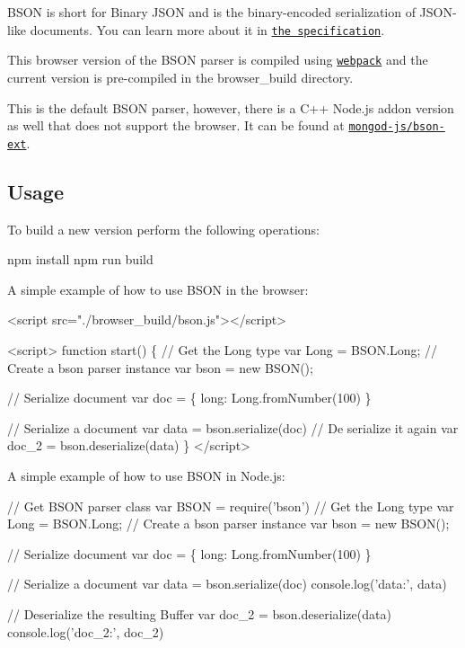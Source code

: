 B\+S\+ON is short for Bin­ary J\+S\+ON and is the bin­ary-\/en­coded seri­al­iz­a­tion of J\+S\+O\+N-\/like doc­u­ments. You can learn more about it in \href{http://bsonspec.org}{\tt the specification}.

This browser version of the B\+S\+ON parser is compiled using \href{https://webpack.js.org/}{\tt webpack} and the current version is pre-\/compiled in the {\ttfamily browser\+\_\+build} directory.

This is the default B\+S\+ON parser, however, there is a C++ Node.\+js addon version as well that does not support the browser. It can be found at \href{https://github.com/mongodb-js/bson-ext}{\tt mongod-\/js/bson-\/ext}.

\subsection*{Usage}

To build a new version perform the following operations\+:


\begin{DoxyCode}
npm install
npm run build
\end{DoxyCode}


A simple example of how to use B\+S\+ON in the browser\+:


\begin{DoxyCode}
<script src="./browser\_build/bson.js"></script>

<script>
  function start() \{
    // Get the Long type
    var Long = BSON.Long;
    // Create a bson parser instance
    var bson = new BSON();

    // Serialize document
    var doc = \{ long: Long.fromNumber(100) \}

    // Serialize a document
    var data = bson.serialize(doc)
    // De serialize it again
    var doc\_2 = bson.deserialize(data)
  \}
</script>
\end{DoxyCode}


A simple example of how to use B\+S\+ON in {\ttfamily Node.\+js}\+:


\begin{DoxyCode}
// Get BSON parser class
var BSON = require('bson')
// Get the Long type
var Long = BSON.Long;
// Create a bson parser instance
var bson = new BSON();

// Serialize document
var doc = \{ long: Long.fromNumber(100) \}

// Serialize a document
var data = bson.serialize(doc)
console.log('data:', data)

// Deserialize the resulting Buffer
var doc\_2 = bson.deserialize(data)
console.log('doc\_2:', doc\_2)
\end{DoxyCode}


